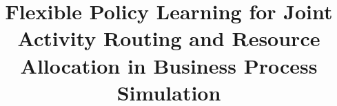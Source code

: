 \documentclass[runningheads]{llncs}
\begin{document}
\title{Flexible Policy Learning for Joint Activity Routing and Resource Allocation in Business Process Simulation}
%
%
%
%
\maketitle
\end{document}
